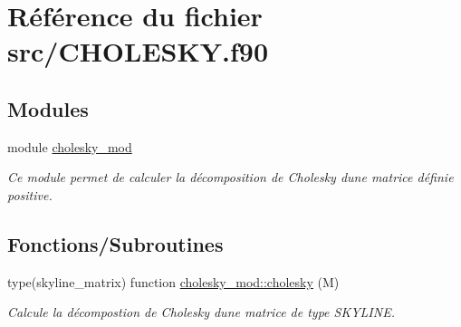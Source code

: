 \hypertarget{_c_h_o_l_e_s_k_y_8f90}{}\section{Référence du fichier src/\+C\+H\+O\+L\+E\+S\+KY.f90}
\label{_c_h_o_l_e_s_k_y_8f90}
\subsection*{Modules}
\begin{DoxyCompactItemize}
\item 
module \hyperlink{namespacecholesky__mod}{cholesky\+\_\+mod}
\begin{DoxyCompactList}\small\item\em Ce module permet de calculer la décomposition de Cholesky d\textquotesingle{}une matrice définie positive. \end{DoxyCompactList}\end{DoxyCompactItemize}
\subsection*{Fonctions/\+Subroutines}
\begin{DoxyCompactItemize}
\item 
type(skyline\+\_\+matrix) function \hyperlink{namespacecholesky__mod_a1cbaf08b2c159febf9d4a76d7819a1cd}{cholesky\+\_\+mod\+::cholesky} (M)
\begin{DoxyCompactList}\small\item\em Calcule la décompostion de Cholesky d\textquotesingle{}une matrice de type S\+K\+Y\+L\+I\+NE. \end{DoxyCompactList}\end{DoxyCompactItemize}
